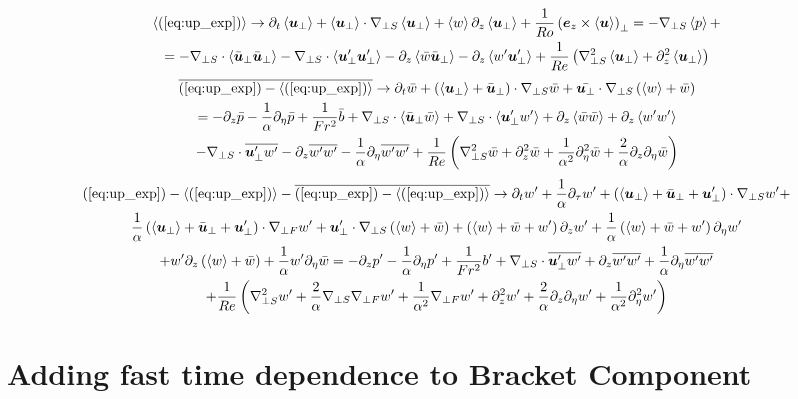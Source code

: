 \documentclass{article}
\begin{document}
\begin{multline}
    \left<(\ref{eq:up_exp})\right> \to \partial_t \left<\boldsymbol{u}_{\perp}\right> +
    \left<\boldsymbol{u}_{\perp}\right>\cdot\nabla_{\perp S}\left<\boldsymbol{u}_{\perp}\right> 
     + \left<w\right>\partial_z\left<\boldsymbol{u}_{\perp}\right> +
     \frac{1}{Ro}\left(\boldsymbol{e}_z\times\left<\boldsymbol{u}\right>\right)_{\perp} = -\nabla_{\perp S}\left<p\right> +\\
    = -\nabla_{\perp S}\cdot\left<\bar{\boldsymbol{u}}_{\perp} \bar{\boldsymbol{u}}_{\perp}\right> -
    \nabla_{\perp S}\cdot\left<\boldsymbol{u}'_{\perp} \boldsymbol{u}'_{\perp}\right> -
    \partial_z\left<\bar{w}\bar{\boldsymbol{u}}_{\perp}\right> -
    \partial_z\left<w'\boldsymbol{u}'_{\perp}\right>
    + \frac{1}{Re}\left(\nabla_{\perp S}^2\left<\boldsymbol{u}_{\perp}\right> + \partial_z^2\left<\boldsymbol{u}_{\perp}\right>\right)
    \label{eq:up_bracket_eq}
\end{multline}
\begin{multline}
    \overline{(\ref{eq:up_exp}) - \left<(\ref{eq:up_exp})\right>} \to \partial_t \bar{w} +
    \left(\left<\boldsymbol{u}_{\perp}\right> + \bar{\boldsymbol{u}}_{\perp}\right)\cdot\nabla_{\perp S} \bar{w} +
    \bar{\boldsymbol{u}_{\perp}} \cdot\nabla_{\perp S}\left(\left<w\right> + \bar{w}\right) \\= - \partial_z
    \bar{p} - \frac{1}{\alpha}\partial_{\eta}\bar{p} + \frac{1}{Fr^2}\bar{b}
    + \nabla_{\perp S}\cdot\left<\bar{\boldsymbol{u}}_{\perp}\bar{w}\right>+ 
    \nabla_{\perp S}\cdot\left<\boldsymbol{u}_{\perp}'w'\right> + \partial_z\left<\bar{w}\bar{w}\right> +
    \partial_z\left<w'w'\right> \\
    - \nabla_{\perp S}\cdot\overline{\boldsymbol{u}_{\perp}'w'} -
    \partial_z\overline{w'w'} - \frac{1}{\alpha}\partial_{\eta}\overline{w'w'} +
    \frac{1}{Re}\left(\nabla_{\perp S}^2\bar{w} + \partial_z^2\bar{w} +
    \frac{1}{\alpha^2}\partial_{\eta}^2\bar{w} +
    \frac{2}{\alpha}\partial_z\partial_{\eta}\bar{w}\right)\label{eq:up_bar_eq}
\end{multline}
\begin{multline}
    (\ref{eq:up_exp}) - \left<(\ref{eq:up_exp})\right> - \overline{(\ref{eq:up_exp}) -
    \left<(\ref{eq:up_exp})\right>} \to \partial_t w' +
    \frac{1}{\alpha}\partial_{\tau} w' + \left(\left<\boldsymbol{u}_{\perp}\right> +
    \bar{\boldsymbol{u}}_{\perp} + \boldsymbol{u}_{\perp}'\right)\cdot\nabla_{\perp S} w' +\\
    \frac{1}{\alpha}\left(\left<\boldsymbol{u}_{\perp}\right> +
    \bar{\boldsymbol{u}}_{\perp} + \boldsymbol{u}_{\perp}'\right)\cdot\nabla_{\perp F} w'
    + \boldsymbol{u}_{\perp}'\cdot\nabla_{\perp S}\left(\left<w\right> + \bar{w}\right)
    + \left(\left<w\right> + \bar{w} + w'\right)\partial_zw' + \frac{1}{\alpha}\left(\left<w\right> + \bar{w} + w'\right)\partial_{\eta}w'  \\
    +  w'\partial_z\left(\left<w\right> +
    \bar{w}\right) + \frac{1}{\alpha}w'\partial_{\eta}\bar{w}
     = -\partial_z p' - \frac{1}{\alpha}\partial_{\eta}p' + \frac{1}{Fr^2}b' + 
     \nabla_{\perp S}\cdot\overline{\boldsymbol{u}_{\perp}'w'} +
    \partial_z\overline{w'w'} + \frac{1}{\alpha}\partial_{\eta}\overline{w'w'}\\
    + \frac{1}{Re}\left(\nabla_{\perp S}^2w' + \frac{2}{\alpha}\nabla_{\perp S}\nabla_{\perp F} w' +
    \frac{1}{\alpha^2}\nabla_{\perp F} w' + \partial_z^2w' +
    \frac{2}{\alpha}\partial_z\partial_{\eta}w' +
    \frac{1}{\alpha^2}\partial_{\eta}^2w'\right) \label{eq:up_pert_eq}
\end{multline}



\section{Adding fast time dependence to Bracket Component}
\end{document}
